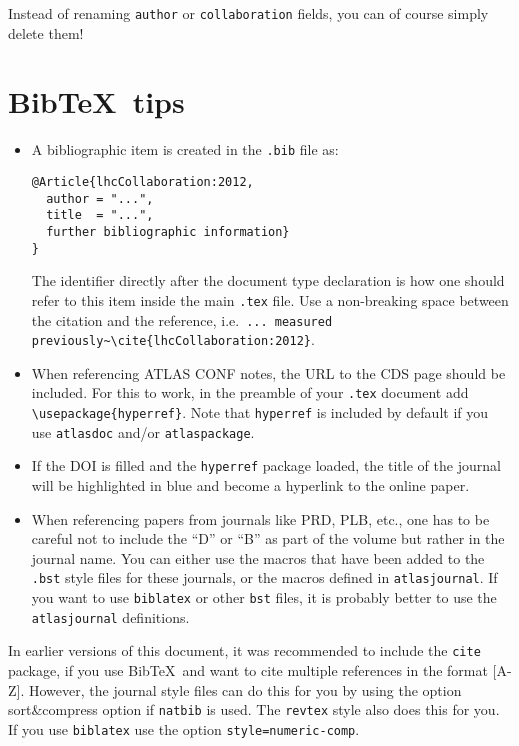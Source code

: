 \documentclass[UKenglish]{latex/atlasdoc}
\newcommand*{\BibTeX}{Bib\TeX}
\newcommand{\File}[1]{\texttt{#1}\xspace}
\newcommand{\Option}[1]{\textsf{#1}\xspace}
\newcommand{\Package}[1]{\texttt{#1}\xspace}
\begin{document}
Instead of renaming \texttt{author} or \texttt{collaboration} fields, you can of course simply delete them!


\section{\BibTeX\ tips}

\begin{itemize}
\item A bibliographic item is created in the \File{.bib} file as:
\begin{verbatim}
@Article{lhcCollaboration:2012,
  author = "...",
  title  = "...",
  further bibliographic information}
}
\end{verbatim}
  The identifier directly after the document type declaration is how one should refer to this item inside the main \File{.tex} file.
  Use a non-breaking space between the citation and the reference, i.e.\
  \verb|... measured previously~\cite{lhcCollaboration:2012}|.
\item When referencing ATLAS CONF notes, the URL to the CDS page should be included.
  For this to work, in the preamble of your \File{.tex} document add
  \texttt{\textbackslash usepackage\{hyperref\}}.
  Note that \Package{hyperref} is included by default if you use \Package{atlasdoc} and/or \Package{atlaspackage}.
\item If the DOI is filled and the \texttt{hyperref} package loaded, 
  the title of the journal will be highlighted in blue and become a hyperlink to the online paper.
\item When referencing papers from journals like PRD, PLB, etc.,
  one has to be careful not to include the ``D'' or ``B'' as part of the volume but rather in the journal name. 
  You can either use the macros that have been added to the \File{.bst} style files for these journals, or
  the macros defined in \Package{atlasjournal}.
  If you want to use \Package{biblatex} or other \File{bst} files, it is probably better to use the
  \Package{atlasjournal} definitions.
\end{itemize}

In earlier versions of this document, it was recommended to include the \Package{cite} package, 
if you use \BibTeX\ and want to cite multiple references in the format [A-Z].
However, the journal style files can do this for you by using the option \Option{sort\&compress} option if \Package{natbib} is used.
The \texttt{revtex} style also does this for you.
If you use \texttt{biblatex} use the option \texttt{style=numeric-comp}.
\end{document}
